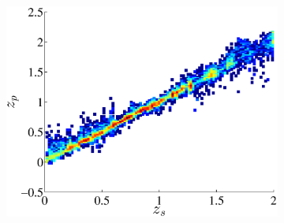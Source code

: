 \documentclass[useAMS,usenatbib,fleqn]{mn2e}
\begin{document}
\begin{figure}
\begin{subfigure}[b]{0.3\textwidth}
                \includegraphics[width=\textwidth]{figures/23_J.eps}
        \end{subfigure}
        

\end{figure}
\end{document}
